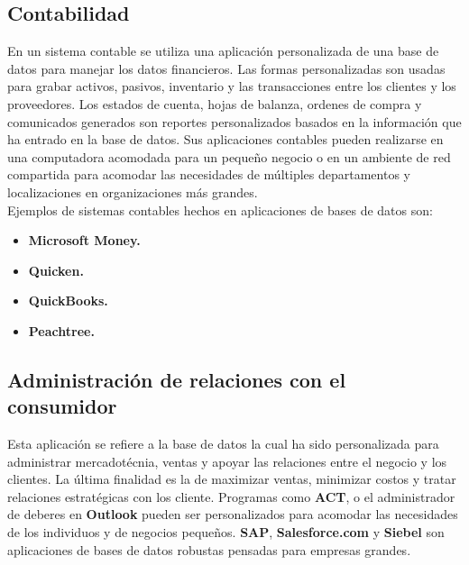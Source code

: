 \documentclass[letterpaper, 12pt]{article}
\begin{document}
\begin{justify}
        \subsection{Contabilidad}
        \justify
        En un sistema contable se utiliza una aplicación personalizada de una base de datos para manejar los datos financieros. Las formas personalizadas son usadas para grabar
        activos, pasivos, inventario y las transacciones entre los clientes y los proveedores. Los estados de cuenta, hojas de balanza, ordenes de compra y comunicados generados son reportes
        personalizados basados en la información que ha entrado en la base de datos. Sus aplicaciones contables pueden realizarse en una computadora acomodada para un pequeño negocio o en un 
        ambiente de red compartida para acomodar las necesidades de múltiples departamentos y localizaciones en organizaciones más grandes. 
        \\\newline
        Ejemplos de sistemas contables hechos en aplicaciones de bases de datos son:
        \begin{itemize}
            \item \textbf{Microsoft Money.}
            \item \textbf{Quicken.}
            \item \textbf{QuickBooks.}
            \item \textbf{Peachtree.}
        \end{itemize} 
        \subsection{Administración de relaciones con el consumidor}
        \justify
        Esta aplicación se refiere a la base de datos la cual ha sido personalizada para administrar mercadotécnia, ventas y apoyar las relaciones entre el negocio y los clientes. La última finalidad
        es la de maximizar ventas, minimizar costos y tratar relaciones estratégicas con los cliente. Programas como \textbf{ACT}, o el administrador de deberes en \textbf{Outlook} pueden ser personalizados para
        acomodar las necesidades de los individuos y de negocios pequeños. \textbf{SAP}, \textbf{Salesforce.com} y \textbf{Siebel} son aplicaciones de bases de datos robustas pensadas para empresas grandes.

\end{justify}
\end{document}
